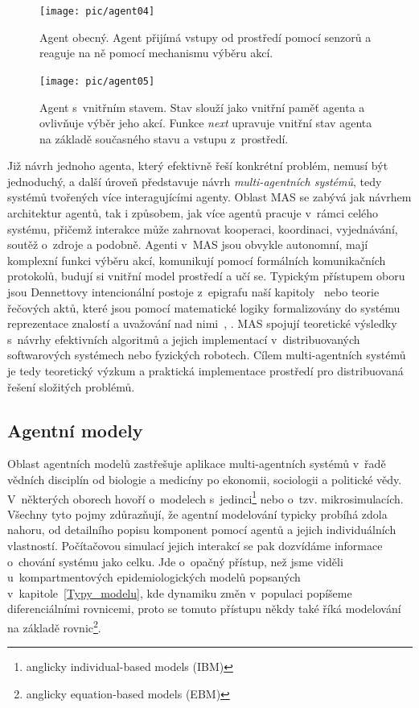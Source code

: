 \begin{figure}%
\centerline{%
\texttt{[image: pic/agent04]}%
}
\caption{Agent obecný. Agent přijímá vstupy od prostředí pomocí senzorů a reaguje na ně pomocí mechanismu výběru akcí.}%
\label{fig:agent}%
\end{figure}

\begin{figure}%
\centerline{%
\texttt{[image: pic/agent05]}%
}
\caption{Agent s~vnitřním stavem. Stav slouží jako vnitřní paměť agenta a ovlivňuje výběr jeho akcí. Funkce \emph{next} upravuje vnitřní stav agenta na základě současného stavu a vstupu z~prostředí.}%
\label{fig:agent-stav}%
\end{figure}

Již návrh jednoho agenta, který efektivně řeší konkrétní problém, nemusí být jednoduchý, a další úroveň představuje návrh \emph{multi-agentních systémů}, tedy systémů tvořených více interagujícími agenty.  
Oblast MAS se zabývá jak návrhem architektur agentů, tak i způsobem, jak více agentů pracuje v~rámci celého systému, přičemž interakce může zahrnovat kooperaci, koordinaci, vyjednávání, soutěž o~zdroje a podobně. Agenti v~MAS jsou obvykle autonomní, mají komplexní funkci výběru akcí, komunikují pomocí formálních komunikačních protokolů, budují si vnitřní model prostředí a učí se. Typickým přístupem oboru jsou Dennettovy intencionální postoje z~epigrafu naší kapitoly~\cite{Dennett87} nebo teorie řečových aktů, které jsou pomocí matematické logiky formalizovány do systému reprezentace znalostí a uvažování nad nimi~\cite{Shoham93}, \cite{Cohen96}. MAS spojují teoretické výsledky s~návrhy efektivních algoritmů a jejich implementací v~distribuovaných softwarových systémech nebo fyzických robotech. Cílem multi-agentních systémů je tedy teoretický výzkum a praktická implementace prostředí pro distribuovaná řešení složitých problémů.  

\subsection*{Agentní modely}

Oblast agentních modelů zastřešuje aplikace multi-agentních systémů v~řadě vědních disciplín od biologie a medicíny po ekonomii, sociologii a politické vědy. V~některých oborech hovoří o~modelech s~jedinci\footnote{anglicky individual-based models (IBM)} nebo o~tzv. mikrosimulacích. 
Všechny tyto poj\-my zdůrazňují, že agentní modelování typicky probíhá zdola nahoru, od detailního popisu komponent pomocí agentů a jejich individuálních vlastností.  Počítačovou simulací jejich interakcí se pak dozvídáme informace o~chování systému jako celku. Jde o~opačný přístup, než jsme viděli u~kompartmentových epidemiologických modelů popsaných v~kapitole~\ref{Typy_modelu}, kde dynamiku změn v~populaci popíšeme diferenciálními rovnicemi, proto se tomuto přístupu někdy  také říká modelování na základě rovnic\footnote{anglicky equation-based models (EBM)}. 

